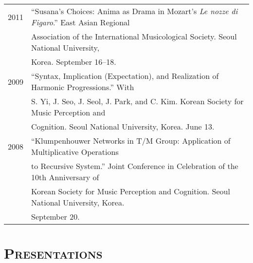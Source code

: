 \documentclass[letter,11pt,draft]{article}
\begin{document}
  \hspace*{-0.25cm}
  \begin{tabular}{p{2.5cm} p{12.5cm}}
  2011 & “Susana’s Choices: Anima as Drama in Mozart’s \textit{Le nozze di Figaro}.” East Asian Regional\\
  & Association of the International Musicological Society. Seoul National University,\\
  & Korea. September 16–18.\\[2mm]

  2009 & “Syntax, Implication (Expectation), and Realization of Harmonic Progressions.” With\\
  & S. Yi, J. Seo, J. Seol, J. Park, and C. Kim. Korean Society for Music Perception and\\
  & Cognition. Seoul National University, Korea. June 13.\\[2mm]

  2008 & “Klumpenhouwer Networks in T/M Group: Application of Multiplicative Operations\\
  & to Recursive System.” Joint Conference in Celebration of the 10th Anniversary of\\
  & Korean Society for Music Perception and Cognition. Seoul National University, Korea.\\
  & September 20.
  \end{tabular}
  
  \vspace{2.5mm}
  
  \section*{\textsc{Presentations}}
  
\end{document}
